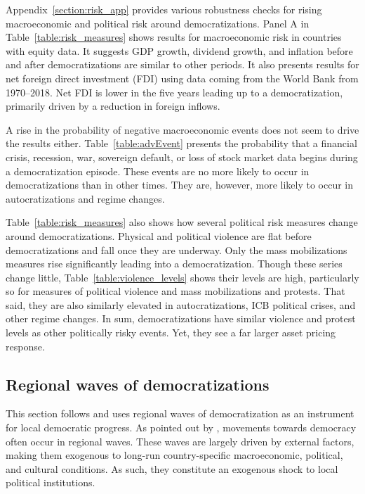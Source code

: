 \documentclass[12pt]{article}
\numberwithin{equation}{section}
\begin{document}
Appendix~\ref{section:risk_app} provides various robustness checks for rising macroeconomic and political risk around democratizations. Panel A in Table~\ref{table:risk_measures} shows results for macroeconomic risk in countries with equity data. It suggests GDP growth, dividend growth, and inflation before and after democratizations are similar to other periods. It also presents results for net foreign direct investment (FDI) using data coming from the World Bank from 1970--2018. Net FDI is lower in the five years leading up to a democratization, primarily driven by a reduction in foreign inflows.

A rise in the probability of negative macroeconomic events does not seem to drive the results either. Table~\ref{table:advEvent} presents the probability that a financial crisis, recession, war, sovereign default, or loss of stock market data begins during a democratization episode. These events are no more likely to occur in democratizations than in other times. They are, however, more likely to occur in autocratizations and regime changes. 

Table~\ref{table:risk_measures} also shows how several political risk measures change around democratizations. Physical and political violence are flat before democratizations and fall once they are underway. Only the mass mobilizations measures rise significantly leading into a democratization. Though these series change little, Table~\ref{table:violence_levels} shows their levels are high, particularly so for measures of political violence and mass mobilizations and protests. That said, they are also similarly elevated in autocratizations, ICB political crises, and other regime changes. In sum, democratizations have similar violence and protest levels as other politically risky events. Yet, they see a far larger asset pricing response.

\subsection{Regional waves of democratizations}\label{section:regional_waves}

This section follows \cite{Acemoglu2019} and uses regional waves of democratization as an instrument for local democratic progress. As pointed out by \citet{Huntington1991}, movements towards democracy often occur in regional waves. These waves are largely driven by external factors, making them exogenous to long-run country-specific macroeconomic, political, and cultural conditions. As such, they constitute an exogenous shock to local political institutions.
\end{document}
